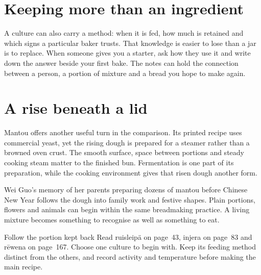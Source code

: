 \section{Keeping more than an ingredient}
A culture can also carry a method: when it is fed, how much is retained and which signs a particular baker trusts. That knowledge is easier to lose than a jar is to replace. When someone gives you a starter, ask how they use it and write down the answer beside your first bake. The notes can hold the connection between a person, a portion of mixture and a bread you hope to make again.

\section{A rise beneath a lid}
Mantou offers another useful turn in the comparison. Its printed recipe uses commercial yeast, yet the rising dough is prepared for a steamer rather than a browned oven crust. The smooth surface, space between portions and steady cooking steam matter to the finished bun. Fermentation is one part of its preparation, while the cooking environment gives that risen dough another form.\citep{elainemantou07}

Wei Guo's memory of her parents preparing dozens of mantou before Chinese New Year follows the dough into family work and festive shapes. Plain portions, flowers and animals can begin within the same breadmaking practice. A living mixture becomes something to recognise as well as something to eat.\citep{guomantou07}

\begin{breadnote}{Follow the portion kept back}
Read ruisleipä on page~43, injera on page~83 and rēwena on page~167. Choose one culture to begin with. Keep its feeding method distinct from the others, and record activity and temperature before making the main recipe.
\end{breadnote}
